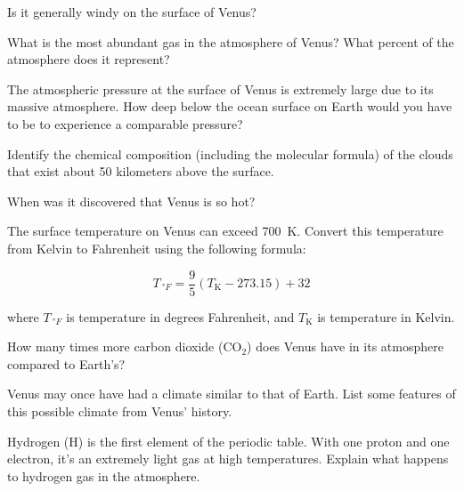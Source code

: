 \documentclass{article}
\numberwithin{equation}{section}
\numberwithin{figure}{section}
\begin{document}
\begin{exercise}
    Is it generally windy on the surface of Venus?
\end{exercise}

\begin{exercise}
    What is the most abundant gas in the atmosphere of Venus? What percent of the atmosphere does it represent?
\end{exercise}

\begin{exercise}
    The atmospheric pressure at the surface of Venus is extremely large due to its massive atmosphere. How deep below the ocean surface on Earth would you have to be to experience a comparable pressure?
\end{exercise}

\begin{exercise}
    Identify the chemical composition (including the molecular formula) of the clouds that exist about 50 kilometers above the surface.
\end{exercise}

\begin{exercise}
    When was it discovered that Venus is so hot?
\end{exercise}

\begin{exercise}
    The surface temperature on Venus can exceed \SI{700}{K}. Convert this temperature from Kelvin to Fahrenheit using the following formula:

    \begin{equation*}
        T_{\SI{}{\degree F}} = \frac{9}{5} \left(T_{\text{K}} - 273.15 \right) + 32
    \end{equation*}

where $T_{\SI{}{\degree F}}$ is temperature in degrees Fahrenheit, and $T_{\text{K}}$ is temperature in Kelvin.
\end{exercise}

\begin{exercise}
    How many times more carbon dioxide ($\text{CO}_2$) does Venus have in its atmosphere compared to Earth's?
\end{exercise}

\begin{exercise}
    Venus may once have had a climate similar to that of Earth. List some features of this possible climate from Venus' history.
\end{exercise}

\begin{exercise}
    Hydrogen (H) is the first element of the periodic table. With one proton and one electron, it's an extremely light gas at high temperatures. Explain what happens to hydrogen gas in the atmosphere. 
\end{exercise}
\end{document}
